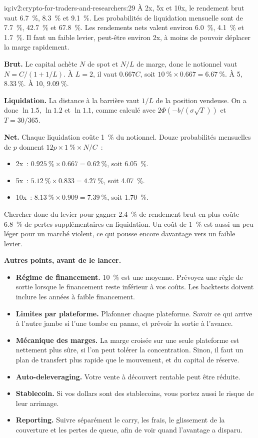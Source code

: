 \begin{solution}{iq:iv2:crypto-for-traders-and-researchers:29}
À 2x, 5x et 10x, le rendement brut vaut 6.7~\%, 8.3~\% et 9.1~\%. Les probabilités de liquidation mensuelle sont de 7.7~\%, 42.7~\% et 67.8~\%. Les rendements nets valent environ 6.0~\%, 4.1~\% et 1.7~\%. Il faut un faible levier, peut-être environ 2x, à moins de pouvoir déplacer la marge rapidement.

\textbf{Brut.} Le capital achète $N$ de spot et $N/L$ de marge, donc le notionnel vaut $N = C/(1 + 1/L)$. À $L = 2$, il vaut $0.667C$, soit $10~\% \times 0.667 = 6.67~\%$. À 5, $8.33~\%$. À 10, $9.09~\%$.

\textbf{Liquidation.} La distance à la barrière vaut $1/L$ de la position vendeuse. On a donc $\ln 1.5$, $\ln 1.2$ et $\ln 1.1$, comme calculé avec $2\Phi(-b/(\sigma\sqrt{T}))$ et $T = 30/365$.

\textbf{Net.} Chaque liquidation coûte 1~\% du notionnel. Douze probabilités mensuelles de $p$ donnent $12p \times 1~\% \times N/C$~:
\begin{itemize}
\item 2x~: $0.925~\% \times 0.667 = 0.62~\%$, soit 6.05~\%.
\item 5x~: $5.12~\% \times 0.833 = 4.27~\%$, soit 4.07~\%.
\item 10x~: $8.13~\% \times 0.909 = 7.39~\%$, soit 1.70~\%.
\end{itemize}
Chercher donc du levier pour gagner 2.4~\% de rendement brut en plus coûte 6.8~\% de pertes supplémentaires en liquidation. Un coût de 1~\% est aussi un peu léger pour un marché violent, ce qui pousse encore davantage vers un faible levier.

\textbf{Autres points, avant de le lancer.}
\begin{itemize}
\item \textbf{Régime de financement.} 10~\% est une moyenne. Prévoyez une règle de sortie lorsque le financement reste inférieur à vos coûts. Les backtests doivent inclure les années à faible financement.
\item \textbf{Limites par plateforme.} Plafonner chaque plateforme. Savoir ce qui arrive à l'autre jambe si l'une tombe en panne, et prévoir la sortie à l'avance.
\item \textbf{Mécanique des marges.} La marge croisée sur une seule plateforme est nettement plus sûre, si l'on peut tolérer la concentration. Sinon, il faut un plan de transfert plus rapide que le mouvement, et du capital de réserve.
\item \textbf{Auto-deleveraging.} Votre vente à découvert rentable peut être réduite.
\item \textbf{Stablecoin.} Si vos dollars sont des stablecoins, vous portez aussi le risque de leur arrimage.
\item \textbf{Reporting.} Suivre séparément le carry, les frais, le glissement de la couverture et les pertes de queue, afin de voir quand l'avantage a disparu.
\end{itemize}


\end{solution}
